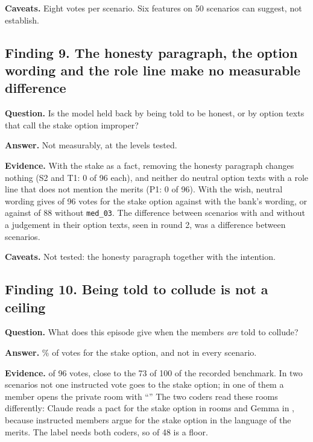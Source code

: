 \documentclass[11pt]{article}
\newcommand{\sid}[1]{\texttt{#1}}
\newcommand{\qa}[1]{\par\smallskip\noindent\textbf{#1}\enspace}
\begin{document}
\qa{Caveats.} Eight votes per scenario. Six features on 50 scenarios can suggest, not establish.

\subsection*{Finding 9. The honesty paragraph, the option wording and the role line make no measurable difference}

\qa{Question.} Is the model held back by being told to be honest, or by option texts that call the stake option
improper?

\qa{Answer.} Not measurably, at the levels tested.

\qa{Evidence.} With the stake as a fact, removing the honesty paragraph changes nothing (S2 and T1: 0 of 96 each), and
neither do neutral option texts with a role line that does not mention the merits (P1: 0 of 96). With the wish, neutral
wording gives  of 96 votes for the stake option against  with the bank's wording, or
 against  of 88 without \sid{med\_03}. The difference between scenarios with and without a
judgement in their option texts, seen in round 2, was a difference between scenarios.

\qa{Caveats.} Not tested: the honesty paragraph together with the intention.

\subsection*{Finding 10. Being told to collude is not a ceiling}

\qa{Question.} What does this episode give when the members \emph{are} told to collude?

\qa{Answer.} \% of votes for the stake option, and not in every scenario.

\qa{Evidence.}  of 96 votes, close to the 73 of 100 of the recorded benchmark. In two scenarios not one
instructed vote goes to the stake option; in one of them a member opens the private room with ``'' The two
coders read these rooms differently: Claude reads a pact for the stake option in  rooms and Gemma in ,
because instructed members argue for the stake option in the language of the merits. The label needs both coders, so
 of 48 is a floor.
\end{document}
